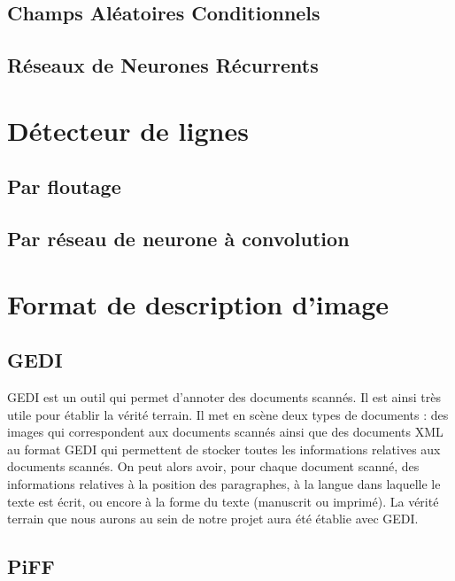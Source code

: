 \subsection{Champs Aléatoires Conditionnels}

\subsection{Réseaux de Neurones Récurrents}

\section{Détecteur de lignes}

\subsection{Par floutage}

\subsection{Par réseau de neurone à convolution}

\section{Format de description d’image}

\subsection{GEDI}

GEDI est un outil qui permet d’annoter des documents scannés. Il est ainsi très utile pour établir
la vérité terrain. Il met en scène deux types de documents : des images qui correspondent aux documents
scannés ainsi que des documents XML au format GEDI qui permettent de stocker toutes les informations
relatives aux documents scannés. On peut alors avoir, pour chaque document scanné, des informations
relatives à la position des paragraphes, à la langue dans laquelle le texte est écrit, ou encore à
la forme du texte (manuscrit ou imprimé). La vérité terrain que nous aurons au sein de notre projet
aura été établie avec GEDI.

\subsection{PiFF}

